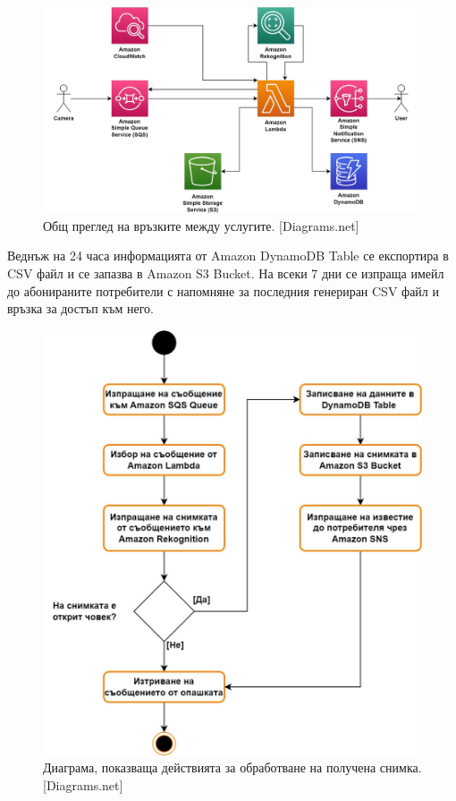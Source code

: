 \documentclass[12pt]{article}
\begin{document}
\hspace{\parindent} 

\begin{figure}[h!]
\centering
    \includegraphics[width=\linewidth]{AWS_overview.jpg}
  \caption{Общ преглед на връзките между услугите. [Diagrams.net]}
\end{figure}

Веднъж на 24 часа информацията от Amazon DynamoDB Table се експортира в CSV файл и се запазва в Amazon S3 Bucket. На всеки 7 дни се изпраща имейл до абонираните потребители с напомняне за последния генериран CSV файл и връзка за достъп към него.

\begin{figure}[h!]
\centering
    \includegraphics[width=\linewidth]{AWS_pic_process.jpg}
  \caption{Диаграма, показваща действията за обработване на получена снимка. [Diagrams.net]}
\end{figure}
\end{document}
